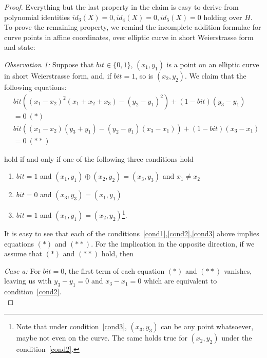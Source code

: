 \begin{proof} Everything but the last property in the claim is easy to derive from polynomial identities 
$id_3(X) =0, id_4(X )= 0, id_5(X) = 0$ holding over $H$. To prove the remaining property, we remind 
the incomplete addition formulae for curve points in affine coordinates, over elliptic curve in short Weierstrasse form and state:\\ 
\vspace{-0.1in}

\noindent \textit{Observation 1:} \label{obs} Suppose that $\mathit{bit} \in \{0,1\}$, $(x_1,y_1)$ is a point on an elliptic curve in 
short Weierstrasse form, and, if $\mathit{bit} = 1$, so is $(x_2,y_2)$. We claim that the following equations: 
\begin{align*}
&\mathit{bit}((x_1 - x_2)^2 (x_1 + x_2 + x_3) - (y_2 - y_1)^2 ) + (1 - \mathit{bit})(y_3 - y_1) \\ & =0 \ (\ast)\\
&\mathit{bit}((x_1 - x_2)(y_3 + y_1) - (y_2 - y_1)(x_3 - x_1)) + (1 - \mathit{bit})(x_3 - x_1) \\ & =0 \ (\ast\ast)
\end{align*}

\noindent hold if and only if one of the following three conditions hold 

\begin{enumerate}
\item \label{cond1} $\mathit{bit}=1$ and $(x_1,y_1)\oplus(x_2,y_2)=(x_3,y_3)$ and $x_1 \neq x_2$
\item \label{cond2} $\mathit{bit}=0$ and $(x_3,y_3)=(x_1,y_1)$ 
\item  \label{cond3} $\mathit{bit}=1$ and $(x_1,y_1)=(x_2,y_2)$\footnote{Note that under condition~\ref{cond3}, $(x_3,y_3)$ 
can be any point whatsoever, maybe not even on the curve. The same holds true for $(x_2, y_2)$ under the condition~\ref{cond2}.}.
\end{enumerate}

\noindent It is easy to see that each of the conditions~\ref{cond1},\ref{cond2},\ref{cond3} above implies equations $(\ast)$ and $(\ast \ast)$.
\noindent For the implication in the opposite direction, if we assume that $(\ast)$ and $(\ast \ast)$ hold, then \\
\vspace{-0.1in}

\noindent \textit{Case a:} For $\mathit{bit}=0$, the first term of each equation $(\ast)$ and $(\ast \ast)$ vanishes, 
leaving us with $y_3-y_1=0$ and $x_3-x_1=0$ which are equivalent to condition~\ref{cond2}. \\
\vspace{-0.1in}


\end{proof}
